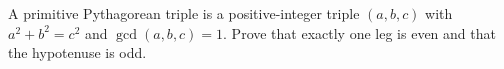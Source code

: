 A primitive Pythagorean triple is a positive-integer triple $(a,b,c)$ with $a^2+b^2=c^2$ and $\gcd(a,b,c)=1$. Prove that exactly one leg is even and that the hypotenuse is odd.

